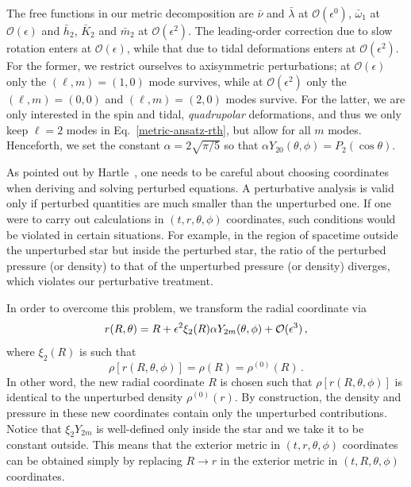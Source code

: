 \documentclass[aps,twocolumn,nofootinbib,showpacs,superscriptaddress,hyperref]{revtex4-1}
\newcommand\be{\begin{equation}}
\newcommand\ee{\end{equation}}
\begin{document}
The free functions in our metric decomposition are $\bar{\nu}$ and $\bar{\lambda}$ at $\mathcal{O}(\epsilon^0)$, $\bar{\omega}_1$ at $\mathcal{O}(\epsilon)$ and $\bar{h}_2$, $\bar{K}_2$ and $\bar{m}_2$ at $\mathcal{O}(\epsilon^2)$. The leading-order correction due to slow rotation enters at $\mathcal{O}(\epsilon)$, while that due to tidal deformations enters at $\mathcal{O}(\epsilon^2)$. For the former, we restrict ourselves to axisymmetric perturbations; at $\mathcal{O}(\epsilon)$ only the $(\ell,m)=(1,0)$ mode survives, while at $\mathcal{O}(\epsilon^2)$ only the $(\ell,m)=(0,0)$ and $(\ell,m)=(2,0)$ modes survive. For the latter, we are only interested in the spin and tidal, {\emph{quadrupolar}} deformations, and thus we only keep $\ell=2$ modes in Eq.~\eqref{metric-ansatz-rth}, but allow for all $m$ modes. Henceforth, we set the constant $\alpha=2 \sqrt{\pi/5}$ so that $\alpha Y_{20}(\theta, \phi) = P_2 (\cos \theta)$. 

As pointed out by Hartle~\cite{hartle1967}, one needs to be careful about choosing coordinates when deriving and solving perturbed equations. A perturbative analysis is valid only if perturbed quantities are much smaller than the unperturbed one. If one were to carry out calculations in $(t,r,\theta,\phi)$ coordinates, such conditions would be violated in certain situations. For example, in the region of spacetime outside the unperturbed star but inside the perturbed star, the ratio of the perturbed pressure (or density) to that of the unperturbed pressure (or density) diverges, which violates our perturbative treatment. 

In order to overcome this problem, we transform the radial coordinate via~\cite{hartle1967} 
%
\be
r(R,\theta) = R + \epsilon^2 \xi_2(R) \alpha Y_{2 m}(\theta, \phi) + {\cal{O}}(\epsilon^{3})\,,
\ee
%
where $\xi_{2}(R)$ is such that
%
\be
\rho [r(R, \theta, \phi)]=\rho(R) = \rho^{(0)}(R)\,.
\ee
% 
In other word, the new radial coordinate $R$ is chosen such that $\rho [r(R, \theta,\phi)]$ is identical to the unperturbed density $\rho^{(0)}(r)$. By construction, the density and pressure in these new coordinates contain only the unperturbed contributions. Notice that $\xi_{2} Y_{2m}$ is well-defined only inside the star and we take it to be constant outside. This means that the exterior metric in $(t,r,\theta,\phi)$ coordinates can be obtained simply by replacing $R \to r$ in the exterior metric in $(t,R,\theta,\phi)$ coordinates. 
\end{document}

